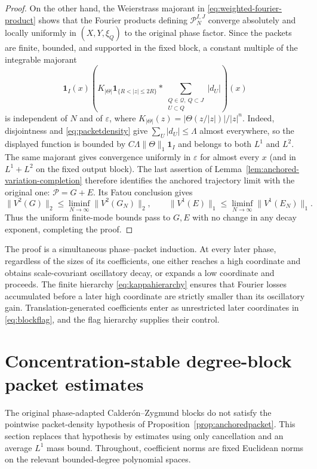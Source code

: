 \documentclass[11pt]{article}
\numberwithin{equation}{section}
\theoremstyle{remark}
\theoremstyle{definition}
\newcommand{\norm}[1]{\lVert #1\rVert}
\begin{document}
\begin{proof}
On the other hand, the Weierstrass majorant in
\eqref{eq:weighted-fourier-product} shows that the Fourier products
defining $\mathcal P_N^{I,J}$ converge absolutely and locally uniformly in
$(X,Y,\xi_Q)$ to the original phase factor.  Since the packets are finite,
bounded, and supported in the fixed block, a constant multiple of the
integrable majorant
\[
 \mathbf1_I(x)
 \left(K_{|\Theta|}\mathbf1_{\{R<|z|\le2R\}}
       *\sum_{\substack{Q\in\mathcal Q,\ Q\subset J\\U\subset Q}}
        |d_U|\right)(x)
\]
is independent of $N$ and of $\varepsilon$, where
$K_{|\Theta|}(z)=|\Theta(z/|z|)|/|z|^n$.  Indeed, disjointness and
\eqref{eq:packetdensity} give $\sum_U|d_U|\le\Lambda$ almost everywhere,
so the displayed function is bounded by
$C\Lambda\norm\Theta_1\mathbf1_I$ and belongs to both $L^1$ and $L^2$.
The same majorant gives convergence uniformly in $\varepsilon$ for almost
every $x$ (and in $L^1+L^2$ on the fixed output block).  The last assertion
of Lemma~\ref{lem:anchored-variation-completion} therefore identifies the
anchored trajectory limit with the original one:
$\mathcal P=G+E$.  Its Fatou conclusion gives
\[
 \norm{V^2(G)}_2\le\liminf_{N\to\infty}\norm{V^2(G_N)}_2,
 \qquad
 \norm{V^1(E)}_1\le\liminf_{N\to\infty}\norm{V^1(E_N)}_1.
\]
Thus the uniform finite-mode bounds pass to $G,E$ with no change in any
decay exponent, completing the proof.
\end{proof}

The proof is a simultaneous phase--packet induction.  At every later phase,
regardless of the sizes of its coefficients, one either reaches a high
coordinate and obtains scale-covariant oscillatory decay, or expands a low
coordinate and proceeds.  The finite hierarchy \eqref{eq:kappahierarchy}
ensures that Fourier losses accumulated before a later high coordinate are
strictly smaller than its oscillatory gain.  Translation-generated
coefficients enter as unrestricted later coordinates in
\eqref{eq:blockflag}, and the flag hierarchy supplies their control.

\section{Concentration-stable degree-block packet estimates}
\label{sec:degree-packets}

The original phase-adapted Calder\'on--Zygmund blocks do not satisfy the
pointwise packet-density hypothesis of
Proposition~\ref{prop:anchoredpacket}.  This section replaces that
hypothesis by estimates using only cancellation and an average $L^1$ mass
bound.  Throughout, coefficient norms are fixed Euclidean norms on the
relevant bounded-degree polynomial spaces.
\end{document}
